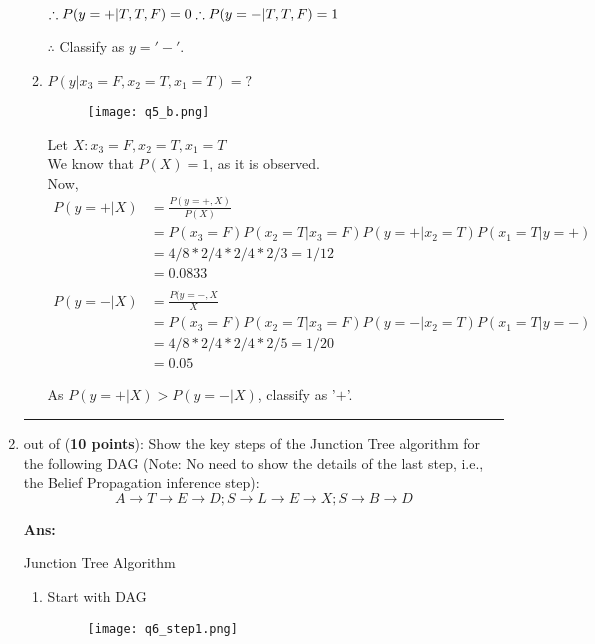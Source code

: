\documentclass{article}%
\begin{document}
\begin{enumerate}
\begin{enumerate}
$\therefore P(y=+ | T,T,F) = 0 \\
\therefore P(y=-| T,T,F) = 1 $

$\therefore$ Classify as $y = '-'$. \\

\item
$ P(y|x_3=F, x_2=T, x_1=T) = ?$ \\
\begin{figure}[h]
\centering
\texttt{[image: q5\_b.png]}
\end{figure}

Let $ X : x_3 = F, x_2 = T, x_1 = T$ \\
We know that $P(X) = 1$, as it is observed. \\

Now,
\begin{align*}
P(y=+|X) &= \frac{P(y=+, X)}{P(X)} \\
&= P(x_3 = F) P(x_2 = T|x_3=F) P(y=+|x_2 = T) P(x_1 = T|y=+) \\
&= 4/8 * 2/4* 2/4 * 2/3 = 1/12\\
&= 0.0833\\
& \\ 
P(y=-|X) &= \frac{P(y=-,X}{X} \\
&= P(x_3 = F) P(x_2 = T|x_3 = F) P(y = -|x_2 = T) P(x_1 = T|y = -) \\
&= 4/8 * 2/4 * 2/4 * 2/5 = 1/20\\
&= 0.05
\end{align*}

As $P(y=+ | X) > P(y=-|X)$, classify as '$+$'.

\end{enumerate}

\newpage

 \item \rule{0.5 in}{1 pt} out of (\textbf{10 points}): Show the key steps of the Junction Tree algorithm for the following DAG (Note: No need to show the details of the last step, i.e., the Belief Propagation inference step): 
\[A \to T \to E\to D; S \to L \to E\to X; S \to B \to D\]

\textbf{Ans:} \\

\begin{center}
Junction Tree Algorithm
\end{center}

\begin{enumerate}
\item Start with DAG \\
\begin{figure}[h]
\centering
\texttt{[image: q6\_step1.png]}
\end{figure}


\end{enumerate}
\end{enumerate}
\end{document}
